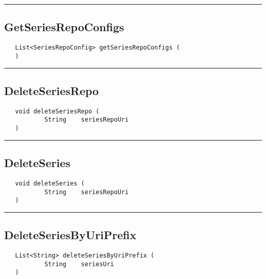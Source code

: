 \rule{15cm}{2pt}
\subsection{GetSeriesRepoConfigs}
\label{Api:GetSeriesRepoConfigs}
\begin{verbatim}
   List<SeriesRepoConfig> getSeriesRepoConfigs (
   )
\end{verbatim}



\rule{15cm}{2pt}
\subsection{DeleteSeriesRepo}
\label{Api:DeleteSeriesRepo}
\begin{verbatim}
   void deleteSeriesRepo (
           String    seriesRepoUri
   )
\end{verbatim}



\rule{15cm}{2pt}
\subsection{DeleteSeries}
\label{Api:DeleteSeries}
\begin{verbatim}
   void deleteSeries (
           String    seriesRepoUri
   )
\end{verbatim}



\rule{15cm}{2pt}
\subsection{DeleteSeriesByUriPrefix}
\label{Api:DeleteSeriesByUriPrefix}
\begin{verbatim}
   List<String> deleteSeriesByUriPrefix (
           String    seriesUri
   )
\end{verbatim}



